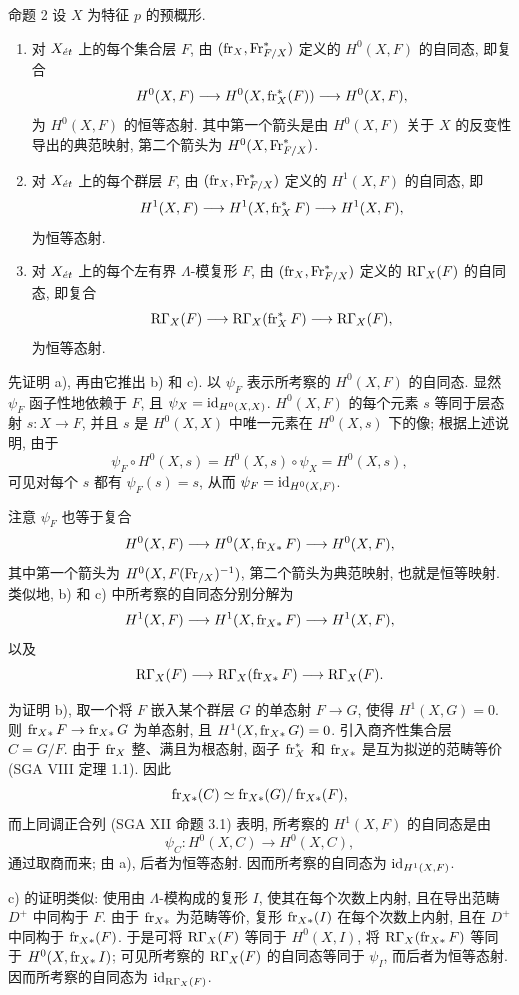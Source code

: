 \begin{statement}{命题 2}
设 $X$ 为特征 $p$ 的预概形.
\begin{enumerate}[label=\alph*)]
\item 对 $X_{\acute{e}t}$ 上的每个集合层 $F$, 由 $(\operatorname{fr}_X,\operatorname{Fr}^*_{F/X})$ 定义的 $H^0(X,F)$ 的自同态, 即复合
\[
H^0(X,F)\longrightarrow H^0(X,\operatorname{fr}_X^*(F))\longrightarrow H^0(X,F),
\]
为 $H^0(X,F)$ 的恒等态射. 其中第一个箭头是由 $H^0(X,F)$ 关于 $X$ 的反变性导出的典范映射, 第二个箭头为 $H^0(X,\operatorname{Fr}^*_{F/X})$.
\item 对 $X_{\acute{e}t}$ 上的每个群层 $F$, 由 $(\operatorname{fr}_X,\operatorname{Fr}^*_{F/X})$ 定义的 $H^1(X,F)$ 的自同态, 即
\[
H^1(X,F)\longrightarrow H^1(X,\operatorname{fr}_X^*F)\longrightarrow H^1(X,F),
\]
为恒等态射.
\item 对 $X_{\acute{e}t}$ 上的每个左有界 $\Lambda$-模复形 $F$, 由 $(\operatorname{fr}_X,\operatorname{Fr}^*_{F/X})$ 定义的 $\mathrm R\Gamma_X(F)$ 的自同态, 即复合
\[
\mathrm R\Gamma_X(F)\longrightarrow \mathrm R\Gamma_X(\operatorname{fr}_X^*F)\longrightarrow \mathrm R\Gamma_X(F),
\]
为恒等态射.
\end{enumerate}
\end{statement}

先证明 a), 再由它推出 b) 和 c). 以 $\psi_F$ 表示所考察的 $H^0(X,F)$ 的自同态. 显然 $\psi_F$ 函子性地依赖于 $F$, 且 $\psi_X=\operatorname{id}_{H^0(X,X)}$. $H^0(X,F)$ 的每个元素 $s$ 等同于层态射 $s:X\to F$, 并且 $s$ 是 $H^0(X,X)$ 中唯一元素在 $H^0(X,s)$ 下的像; 根据上述说明, 由于
\[
\psi_F\circ H^0(X,s)=H^0(X,s)\circ\psi_X=H^0(X,s),
\]
可见对每个 $s$ 都有 $\psi_F(s)=s$, 从而 $\psi_F=\operatorname{id}_{H^0(X,F)}$.

注意 $\psi_F$ 也等于复合
\[
H^0(X,F)\longrightarrow H^0(X,\operatorname{fr}_{X*}F)
\longrightarrow H^0(X,F),
\]
其中第一个箭头为 $H^0(X,F(\operatorname{Fr}_{/X})^{-1})$, 第二个箭头为典范映射, 也就是恒等映射. 类似地, b) 和 c) 中所考察的自同态分别分解为
\[
H^1(X,F)\longrightarrow H^1(X,\operatorname{fr}_{X*}F)
\longrightarrow H^1(X,F),
\]
以及
\[
\mathrm R\Gamma_X(F)\longrightarrow \mathrm R\Gamma_X(\operatorname{fr}_{X*}F)
\longrightarrow \mathrm R\Gamma_X(F).
\]

为证明 b), 取一个将 $F$ 嵌入某个群层 $G$ 的单态射 $F\to G$, 使得 $H^1(X,G)=0$. 则 $\operatorname{fr}_{X*}F\to\operatorname{fr}_{X*}G$ 为单态射, 且 $H^1(X,\operatorname{fr}_{X*}G)=0$. 引入商齐性集合层 $C=G/F$. 由于 $\operatorname{fr}_X$ 整、满且为根态射, 函子 $\operatorname{fr}_X^*$ 和 $\operatorname{fr}_{X*}$ 是互为拟逆的范畴等价 (SGA VIII 定理 1.1). 因此
\[
\operatorname{fr}_{X*}(C)\simeq\operatorname{fr}_{X*}(G)/\operatorname{fr}_{X*}(F),
\]
而上同调正合列 (SGA XII 命题 3.1) 表明, 所考察的 $H^1(X,F)$ 的自同态是由
\[
\psi_C:H^0(X,C)\longrightarrow H^0(X,C),
\]
通过取商而来; 由 a), 后者为恒等态射. 因而所考察的自同态为 $\operatorname{id}_{H^1(X,F)}$.

c) 的证明类似: 使用由 $\Lambda$-模构成的复形 $I$, 使其在每个次数上内射, 且在导出范畴 $D^+$ 中同构于 $F$. 由于 $\operatorname{fr}_{X*}$ 为范畴等价, 复形 $\operatorname{fr}_{X*}(I)$ 在每个次数上内射, 且在 $D^+$ 中同构于 $\operatorname{fr}_{X*}(F)$. 于是可将 $\mathrm R\Gamma_X(F)$ 等同于 $H^0(X,I)$, 将 $\mathrm R\Gamma_X(\operatorname{fr}_{X*}F)$ 等同于 $H^0(X,\operatorname{fr}_{X*}I)$; 可见所考察的 $\mathrm R\Gamma_X(F)$ 的自同态等同于 $\psi_I$, 而后者为恒等态射. 因而所考察的自同态为 $\operatorname{id}_{\mathrm R\Gamma_X(F)}$.

